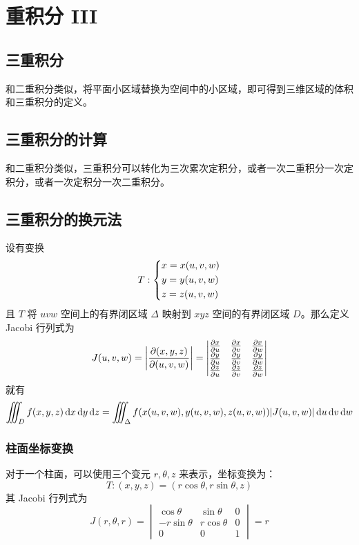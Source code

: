 \section{重积分 III}

\subsection{三重积分}

和二重积分类似，将平面小区域替换为空间中的小区域，即可得到三维区域的体积和三重积分的定义。

\subsection{三重积分的计算}

和二重积分类似，三重积分可以转化为三次累次定积分，或者一次二重积分一次定积分，或者一次定积分一次二重积分。

\subsection{三重积分的换元法}

设有变换
$$
T: \begin{dcases}
	x = x(u, v, w) \\
	y = y(u, v, w) \\
	z = z(u, v, w) \\
\end{dcases}
$$
且 $T$ 将 $uvw$ 空间上的有界闭区域 $\Delta$ 映射到 $xyz$ 空间的有界闭区域 $D$。那么定义 Jacobi 行列式为
$$
J(u, v, w) = \abs{\frac{\partial(x, y, z)}{\partial(u, v, w)}} = \begin{vmatrix}
	\pdv{x}{u} & \pdv{x}{v} & \pdv{x}{w} \\
	\pdv{y}{u} & \pdv{y}{v} & \pdv{y}{w} \\
	\pdv{z}{u} & \pdv{z}{v} & \pdv{z}{w} \\
\end{vmatrix}
$$
就有
$$
\iiint_D f(x, y, z) \dd{x} \dd{y} \dd{z} = \iiint_{\Delta} f(x(u, v, w), y(u, v, w), z(u, v, w)) \abs{J(u, v, w)} \dd{u} \dd{v} \dd{w}
$$

\subsubsection{柱面坐标变换}

对于一个柱面，可以使用三个变元 $r, \theta, z$ 来表示，坐标变换为：
$$
T: (x, y, z) = (r \cos \theta, r \sin \theta, z)
$$
其 Jacobi 行列式为
$$
J(r, \theta, r) = \begin{vmatrix}
	\cos \theta & \sin \theta & 0 \\
	-r \sin \theta & r \cos \theta & 0 \\
	0 & 0 & 1
\end{vmatrix} = r
$$

